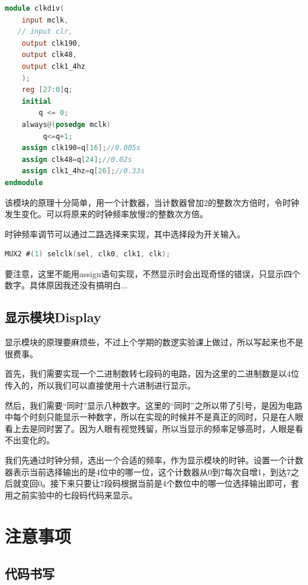 \documentclass[twocolumn]{article} %
\begin{document}
\begin{sloppypar}
\begin{lstlisting}[language=Verilog]   
module clkdiv(
    input mclk,
   // input clr,
    output clk190,
    output clk48,
    output clk1_4hz
    );
    reg [27:0]q;
    initial
        q <= 0;
    always@(posedge mclk)
         q<=q+1;
    assign clk190=q[16];//0.005s
    assign clk48=q[24];//0.02s
    assign clk1_4hz=q[26];//0.33s      
endmodule
\end{lstlisting}  

该模块的原理十分简单，用一个计数器，当计数器曾加2的整数次方倍时，令时钟发生变化。可以将原来的时钟频率放慢2的整数次方倍。

时钟频率调节可以通过二路选择来实现，其中选择段为开关输入。

\begin{lstlisting}[language=Verilog]   
MUX2 #(1) selclk(sel, clk0, clk1, clk);
\end{lstlisting}  

要注意，这里不能用assign语句实现，不然显示时会出现奇怪的错误，只显示四个数字。具体原因我还没有搞明白...

\subsection{显示模块Display}

显示模块的原理要麻烦些，不过上个学期的数逻实验课上做过，所以写起来也不是很费事。

首先，我们需要实现一个二进制数转七段码的电路，因为这里的二进制数是以4位传入的，所以我们可以直接使用十六进制进行显示。

然后，我们需要“同时”显示八种数字。这里的“同时”之所以带了引号，是因为电路中每个时刻只能显示一种数字，所以在实现的时候并不是真正的同时，只是在人眼看上去是同时罢了。因为人眼有视觉残留，所以当显示的频率足够高时，人眼是看不出变化的。

我们先通过时钟分频，选出一个合适的频率，作为显示模块的时钟。设置一个计数器表示当前选择输出的是4位中的哪一位，这个计数器从0到7每次自增1，到达7之后就变回0。接下来只要让7段码根据当前是4个数位中的哪一位选择输出即可，套用之前实验中的七段码代码来显示。

\section{注意事项}

\subsection{代码书写}


\end{sloppypar}
\end{document}
